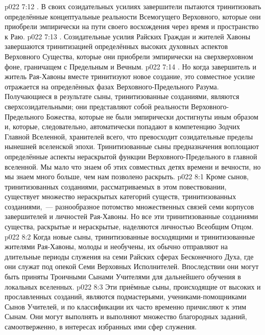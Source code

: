\vs p022 7:12 . В своих созидательных усилиях завершители пытаются тринитизовать определённые концептуальные реальности Всемогущего Верховного, которые они приобрели эмпирически на пути своего восхождения через время и пространство к Раю.
\vs p022 7:13 . Созидательные усилия Райских Граждан и жителей Хавоны завершаются тринитизацией определённых высоких духовных аспектов Верховного Существа, которые они приобрели эмпирически на сверхверховном фоне, граничащем с Предельным и Вечным.
\vs p022 7:14 . Но когда завершитель и житель Рая\hyp{}Хавоны вместе тринитизуют новое создание, это совместное усилие отражается на определённых фазах Верховного\hyp{}Предельного Разума. Получающиеся в результате сыны, тринитизованные созданиями, являются сверхсозидательными; они представляют собой реальности Верховного\hyp{}Предельного Божества, которые не были эмпирически достигнуты иным образом и, которые, следовательно, автоматически попадают в компетенцию Зодчих Главной Вселенной, хранителей всего, что превосходит созидательные пределы нынешней вселенской эпохи. Тринитизованные сыны предназначения воплощают определённые аспекты нераскрытой функции Верховного\hyp{}Предельного в главной вселенной. Мы мало что знаем об этих совместных детях времени и вечности, но мы знаем много больше, чем нам позволено раскрыть.
\vs p022 8:1 Кроме сынов, тринитизованных созданиями, рассматриваемых в этом повествовании, существует множество нераскрытых категорий существ, тринитизованных созданиями,~--- разнообразное потомство множественных связей семи корпусов завершителей и личностей Рая\hyp{}Хавоны. Но все эти тринитизованные созданиями существа, раскрытые и нераскрытые, наделяются личностью Всеобщим Отцом.
\vs p022 8:2 \pc Когда новые сыны, тринитизованные восходящими и тринитизованные жителями Рая\hyp{}Хавоны, молоды и необучены, их обычно отправляют на длительные периоды служения на семи Райских сферах Бесконечного Духа, где они служат под опекой Семи Верховных Исполнителей. Впоследствии они могут быть приняты Троичными Сынами Учителями для дальнейшего обучения в локальных вселенных.
\vs p022 8:3 Эти приёмные сыны, происходящие от высоких и прославленных созданий, являются подмастерьями, учениками\hyp{}помощниками Сынов Учителей, и по классификации их часто временно причисляют к этим Сынам. Они могут выполнять и выполняют множество благородных заданий, самоотверженно, в интересах избранных ими сфер служения.
